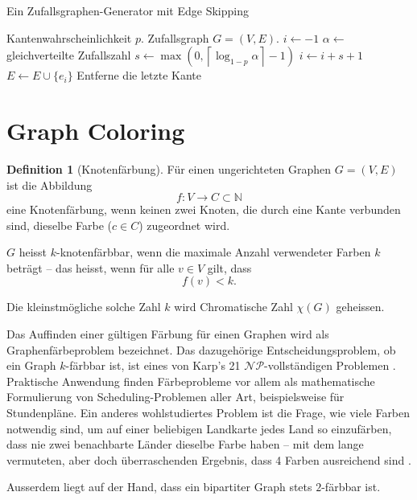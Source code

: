 \documentclass[11pt,abstracton]{scrreprt} %
\theoremstyle{definition}
\newtheorem{definition}{Definition}
\begin{document}
\begin{enumerate}
\begin{algorithm}
\caption{Ein Zufallsgraphen-Generator mit Edge Skipping}
\label{gen.opt}
\begin{algorithmic}
\Require
	\Statex Kantenwahrscheinlichkeit $p$.
\Ensure
	\Statex Zufallsgraph $G = (V, E)$.
\Statex
\Statex $i \gets -1$
\State $\alpha\gets$ gleichverteilte Zufallszahl
\State $s \gets \max(0, \left\lceil \log_{1-p}\alpha\right\rceil - 1)$
\State $i \gets i + s + 1$
\State $E \gets E \cup \{e_i\}$
\EndWhile
\State Entferne die letzte Kante
\end{algorithmic}
\end{algorithm}

\end{enumerate}

\section{Graph Coloring}

\begin{definition}[Knotenfärbung]

Für einen ungerichteten Graphen $G = (V, E)$ ist die Abbildung
\[
f : V \rightarrow C \subset \mathbb{N}
\]
eine Knotenfärbung, wenn keinen zwei Knoten, die durch eine Kante verbunden sind, dieselbe Farbe ($c \in C$) zugeordnet wird.

$G$ heisst $k$-knotenfärbbar, wenn die maximale Anzahl verwendeter Farben $k$ beträgt -- das heisst, wenn für alle $v \in V$ gilt, dass
\[
f(v) < k.
\]

Die kleinstmögliche solche Zahl $k$ wird Chromatische Zahl $\chi(G)$ geheissen.

\end{definition}

Das Auffinden einer gültigen Färbung für einen Graphen wird als Graphenfärbeproblem bezeichnet. Das dazugehörige Entscheidungsproblem, ob ein Graph $k$-färbbar ist, ist eines von Karp's 21 $\mathcal{NP}$-vollständigen Problemen \cite{hopcroft}. Praktische Anwendung finden Färbeprobleme vor allem als mathematische Formulierung von Scheduling-Problemen aller Art, beispielsweise für Stundenpläne. Ein anderes wohlstudiertes Problem ist die Frage, wie viele Farben notwendig sind, um auf einer beliebigen Landkarte jedes Land so einzufärben, dass nie zwei benachbarte Länder dieselbe Farbe haben -- mit dem lange vermuteten, aber doch überraschenden Ergebnis, dass 4 Farben ausreichend sind \cite{gonthier}.

\bigskip
Ausserdem liegt auf der Hand, dass ein bipartiter Graph stets $2$-färbbar ist.
\end{document}
